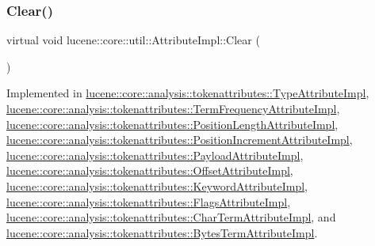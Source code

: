 \subsubsection{\texorpdfstring{Clear()}{Clear()}}
{\footnotesize\ttfamily virtual void lucene\+::core\+::util\+::\+Attribute\+Impl\+::\+Clear (\begin{DoxyParamCaption}{ }\end{DoxyParamCaption})\hspace{0.3cm}{\ttfamily [pure virtual]}}



Implemented in \mbox{\hyperlink{classlucene_1_1core_1_1analysis_1_1tokenattributes_1_1TypeAttributeImpl_a373559195f408497ab81408bab95a2b1}{lucene\+::core\+::analysis\+::tokenattributes\+::\+Type\+Attribute\+Impl}}, \mbox{\hyperlink{classlucene_1_1core_1_1analysis_1_1tokenattributes_1_1TermFrequencyAttributeImpl_aaa575565a7b466b6bdcf4d8042f3f582}{lucene\+::core\+::analysis\+::tokenattributes\+::\+Term\+Frequency\+Attribute\+Impl}}, \mbox{\hyperlink{classlucene_1_1core_1_1analysis_1_1tokenattributes_1_1PositionLengthAttributeImpl_a0f4a9a4b9ab64ced895b8fa5b9983cbd}{lucene\+::core\+::analysis\+::tokenattributes\+::\+Position\+Length\+Attribute\+Impl}}, \mbox{\hyperlink{classlucene_1_1core_1_1analysis_1_1tokenattributes_1_1PositionIncrementAttributeImpl_a49cd1a34361a145c3b674f1f3d529641}{lucene\+::core\+::analysis\+::tokenattributes\+::\+Position\+Increment\+Attribute\+Impl}}, \mbox{\hyperlink{classlucene_1_1core_1_1analysis_1_1tokenattributes_1_1PayloadAttributeImpl_a264f13a218ec4caca8c724e3c34f64b6}{lucene\+::core\+::analysis\+::tokenattributes\+::\+Payload\+Attribute\+Impl}}, \mbox{\hyperlink{classlucene_1_1core_1_1analysis_1_1tokenattributes_1_1OffsetAttributeImpl_af19f560600cc53e48c592aa6d9c48a91}{lucene\+::core\+::analysis\+::tokenattributes\+::\+Offset\+Attribute\+Impl}}, \mbox{\hyperlink{classlucene_1_1core_1_1analysis_1_1tokenattributes_1_1KeywordAttributeImpl_a019bfed2dce94170444db84c7575f43c}{lucene\+::core\+::analysis\+::tokenattributes\+::\+Keyword\+Attribute\+Impl}}, \mbox{\hyperlink{classlucene_1_1core_1_1analysis_1_1tokenattributes_1_1FlagsAttributeImpl_a67ed39990f3f9eac90c91e880ad5cc31}{lucene\+::core\+::analysis\+::tokenattributes\+::\+Flags\+Attribute\+Impl}}, \mbox{\hyperlink{classlucene_1_1core_1_1analysis_1_1tokenattributes_1_1CharTermAttributeImpl_a4e0b1a5a06996822798414f3a41af6e6}{lucene\+::core\+::analysis\+::tokenattributes\+::\+Char\+Term\+Attribute\+Impl}}, and \mbox{\hyperlink{classlucene_1_1core_1_1analysis_1_1tokenattributes_1_1BytesTermAttributeImpl_a6fa48596a507c937bd874d46ef5ca963}{lucene\+::core\+::analysis\+::tokenattributes\+::\+Bytes\+Term\+Attribute\+Impl}}.

